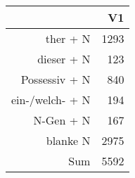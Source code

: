 \begin{tabular}{rr}
  \hline
 & V1 \\ 
  \hline
ther + N & 1293 \\ 
  dieser + N & 123 \\ 
  Possessiv + N & 840 \\ 
  ein-/welch- + N & 194 \\ 
  N-Gen + N & 167 \\ 
  blanke N & 2975 \\ 
  Sum & 5592 \\ 
   \hline
\end{tabular}
